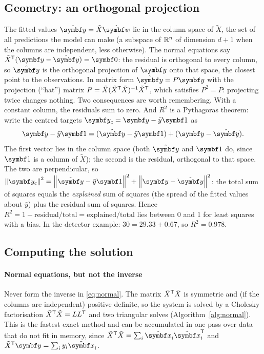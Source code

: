 \documentclass[11pt]{article}
\newcommand{\Xt}{\tilde X}
\newcommand{\xt}{\tilde{\x}}
\newcommand{\w}{\vect{w}}
\newcommand{\y}{\vect{y}}
\begin{document}
\subsection{Geometry: an orthogonal projection}\label{sec:geometry}

The fitted values $\hat{\y} = \Xt\hat{\w}$ lie in the column space of $\Xt$, the set of all predictions the model can make
(a subspace of $\mathbb{R}^n$ of dimension $d+1$ when the columns are independent, less otherwise). The normal equations say $\Xt\T(\y - \hat{\y}) = \vect{0}$: the residual is
orthogonal to every column, so $\hat{\y}$ is the orthogonal projection of $\y$ onto that space, the closest point to the
observations. In matrix form $\hat{\y} = P\y$ with the projection (``hat'') matrix $P = \Xt(\Xt\T\Xt)^{-1}\Xt\T$, which
satisfies $P^2 = P$: projecting twice changes nothing. Two consequences are worth remembering. With a constant column,
the residuals sum to zero. And $R^2$ is a Pythagoras theorem: write the centred targets $\y_c = \y - \bar y\vect{1}$ as
\[
  \y - \bar y\vect{1} = (\hat{\y} - \bar y\vect{1}) + (\y - \hat{\y}) .
\]
The first vector lies in the column space (both $\hat{\y}$ and $\vect{1}$ do, since $\vect{1}$ is a column of $\Xt$); the
second is the residual, orthogonal to that space. The two are perpendicular, so
$\norm{\y_c}^2 = \norm{\hat{\y} - \bar y\vect{1}}^2 + \norm{\y - \hat{\y}}^2$: the total sum of squares equals the
\emph{explained} sum of squares (the spread of the fitted values about $\bar y$) plus the residual sum of squares. Hence
$R^2 = 1 - \text{residual}/\text{total} = \text{explained}/\text{total}$ lies between 0 and 1 for least squares with a
bias. In the detector example: $30 = 29.33 + 0.67$, so $R^2 = 0.978$.

\subsection{Computing the solution}\label{sec:computing}

\paragraph{Normal equations, but not the inverse} Never form the inverse in \eqref{eq:normal}. The matrix $\Xt\T\Xt$ is
symmetric and (if the columns are independent) positive definite, so the system is solved by a Cholesky factorisation
$\Xt\T\Xt = LL\T$ and two triangular solves (Algorithm~\ref{alg:normal}). This is the fastest exact method and can be
accumulated in one pass over data that do not fit in memory, since $\Xt\T\Xt = \sum_i \xt_i\xt_i\T$ and
$\Xt\T\y = \sum_i y_i\xt_i$.
\end{document}
